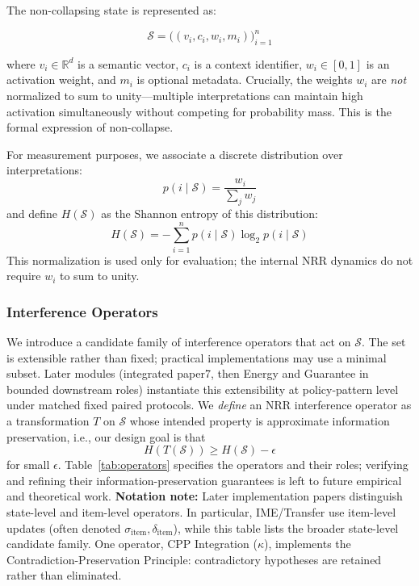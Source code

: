 \documentclass[11pt,a4paper]{article}
\begin{document}
The non-collapsing state is represented as:

\begin{equation}
\mathcal{S} = \bigl((v_i, c_i, w_i, m_i)\bigr)_{i=1}^{n}
\end{equation}

where $v_i \in \mathbb{R}^d$ is a semantic vector, $c_i$ is a context identifier, $w_i \in [0,1]$ is an activation weight, and $m_i$ is optional metadata. Crucially, the weights $w_i$ are \textit{not} normalized to sum to unity---multiple interpretations can maintain high activation simultaneously without competing for probability mass. This is the formal expression of non-collapse.

For measurement purposes, we associate a discrete distribution over interpretations:
\begin{equation}
p(i \mid \mathcal{S}) = \frac{w_i}{\sum_j w_j}
\end{equation}
and define $H(\mathcal{S})$ as the Shannon entropy of this distribution:
\begin{equation}
H(\mathcal{S}) = - \sum_{i=1}^{n} p(i \mid \mathcal{S}) \log_2 p(i \mid \mathcal{S})
\end{equation}
This normalization is used only for evaluation; the internal NRR dynamics do not require $w_i$ to sum to unity.

\subsubsection{Interference Operators}

We introduce a candidate family of interference operators that act on $\mathcal{S}$.
The set is extensible rather than fixed; practical implementations may use a minimal subset.
Later modules (integrated paper7, then Energy and Guarantee in bounded downstream roles) instantiate this extensibility at policy-pattern level under matched fixed paired protocols.
We \emph{define} an NRR interference operator as a transformation $T$ on $\mathcal{S}$
whose intended property is approximate information preservation, i.e., our design goal is that
\begin{equation}
H(T(\mathcal{S})) \geq H(\mathcal{S}) - \epsilon
\end{equation}
for small $\epsilon$.
Table~\ref{tab:operators} specifies the operators and their roles; verifying and refining their information-preservation guarantees is left to future empirical and theoretical work.
\textbf{Notation note:} Later implementation papers distinguish state-level and item-level operators.
In particular, IME/Transfer use item-level updates (often denoted $\sigma_{\text{item}}, \delta_{\text{item}}$),
while this table lists the broader state-level candidate family.
One operator, CPP Integration ($\kappa$), implements the Contradiction-Preservation Principle: contradictory hypotheses are retained rather than eliminated.
\end{document}
